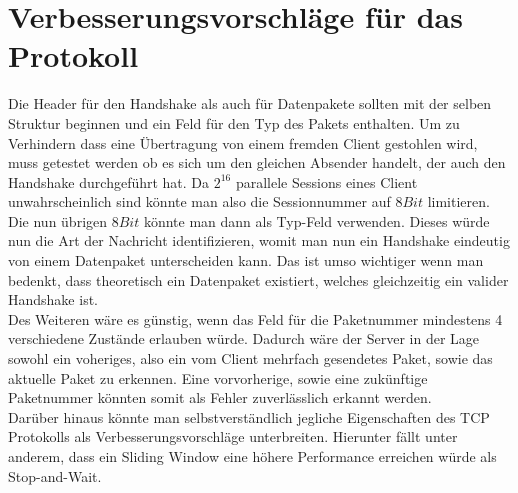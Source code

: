 \chapter{Verbesserungsvorschläge für das Protokoll}

Die Header für den Handshake als auch für Datenpakete sollten mit der selben Struktur beginnen und ein Feld für den Typ des Pakets enthalten.
Um zu Verhindern dass eine Übertragung von einem fremden Client gestohlen wird, muss getestet werden ob es sich um den gleichen Absender handelt, der auch den Handshake durchgeführt hat.
Da \(2^16\) parallele Sessions eines Client unwahrscheinlich sind könnte man also die Sessionnummer auf \(8Bit\) limitieren.
Die nun übrigen \(8Bit\) könnte man dann als Typ-Feld verwenden.
Dieses würde nun die Art der Nachricht identifizieren, womit man nun ein Handshake eindeutig von einem Datenpaket unterscheiden kann.
Das ist umso wichtiger wenn man bedenkt, dass theoretisch ein Datenpaket existiert, welches gleichzeitig ein valider Handshake ist. \\

Des Weiteren wäre es günstig, wenn das Feld für die Paketnummer mindestens 4 verschiedene Zustände erlauben würde.
Dadurch wäre der Server in der Lage sowohl ein voheriges, also ein vom Client mehrfach gesendetes Paket, sowie das aktuelle Paket zu erkennen.
Eine vorvorherige, sowie eine zukünftige Paketnummer könnten somit als Fehler zuverlässlich erkannt werden. \\

Darüber hinaus könnte man selbstverständlich jegliche Eigenschaften des TCP Protokolls als Verbesserungsvorschläge unterbreiten.
Hierunter fällt unter anderem, dass ein Sliding Window eine höhere Performance erreichen würde als Stop-and-Wait.


